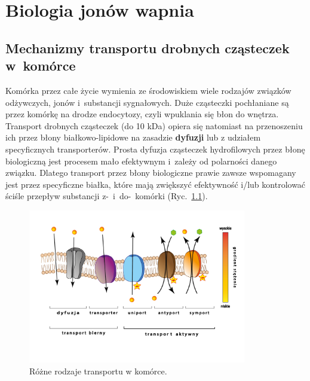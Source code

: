 \setcounter{page}{1}
%

\chapter{Biologia jonów wapnia}
\label{chap:wstep}

\section{Mechanizmy transportu drobnych cząsteczek w~komórce}


Komórka przez całe życie wymienia ze środowiskiem wiele rodzajów związków odżywczych, jonów i~substancji sygnałowych. Duże cząsteczki pochłaniane są przez komórkę na drodze endocytozy, czyli wpuklania się błon do wnętrza. Transport drobnych cząsteczek (do 10 kDa) opiera się natomiast na przenoszeniu ich przez błony białkowo-lipidowe na zasadzie \textbf{dyfuzji} lub z udziałem specyficznych transporterów. Prosta dyfuzja cząsteczek hydrofilowych przez błonę biologiczną jest procesem mało efektywnym i~zależy od polarności danego związku. Dlatego transport przez błony biologiczne prawie zawsze wspomagany jest przez specyficzne białka, które mają zwiększyć efektywność i/lub kontrolować ściśle przepływ substancji z-~i~do-~komórki (Ryc.~\ref{fig:transport}).

\begin{figure}[tb]
\centering
\vspace{-40pt}
\includegraphics[width=0.85\textwidth]{rysunki/rozdzial_1/rodz_transportu.png}
\vspace{-40pt}
\caption{Różne rodzaje transportu w komórce.}
\label{fig:transport}
\end{figure}

